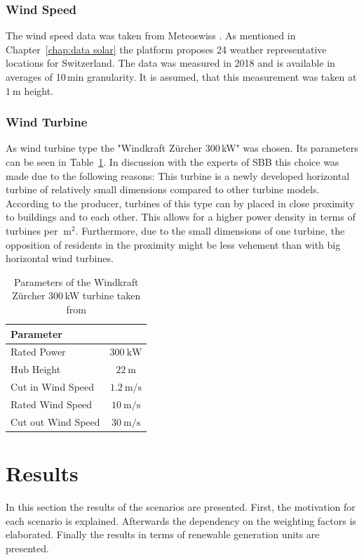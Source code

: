 \subsubsection{Wind Speed}
The wind speed data was taken from Meteoswiss \cite{idaweb}. As mentioned in Chapter~\ref{chap:data solar} the platform proposes 24 weather representative locations for Switzerland. The data was measured in 2018 and is available in averages of 10\,min granularity. It is assumed, that this measurement was taken at $\SI{1}{\metre}$ height. 

\subsubsection{Wind Turbine}
As wind turbine type the "Windkraft Zürcher 300\,kW" was chosen. Its parameters can be seen in Table~\ref{tab:wind_turbine_zurcher}. In discussion with the experts of SBB this choice was made due to the following reasons: This turbine is a newly developed horizontal turbine of relatively small dimensions compared to other turbine models. According to the producer, turbines of this type can by placed in close proximity to buildings and to each other. This allows for a higher power density in terms of turbines per $\SI{}{\square\metre}$. Furthermore, due to the small dimensions of one turbine, the opposition of residents in the proximity might be less vehement than with big horizontal wind turbines. 


\begin{table}[h!]
\centering
\begin{tabular}{|l|c|} \hline
    \textbf{Parameter} & \\ \hline
     Rated Power & $\SI{300}{\kW}$ \\ \hline
     Hub Height & $\SI{22}{\m}$  \\ \hline
     Cut in Wind Speed & $\SI{1.2}{\meter\per\second}$ \\ \hline
     Rated Wind Speed & $\SI{10}{\meter\per\second}$ \\ \hline
     Cut out Wind Speed & $\SI{30}{\meter\per\second}$ \\ \hline
\end{tabular}
\caption{Parameters of the Windkraft Zürcher 300\,kW turbine taken from \cite{zurcher}}
\label{tab:wind_turbine_zurcher}
\end{table}


\section{Results}
In this section the results of the scenarios are presented. First, the motivation for each scenario is explained. Afterwards the dependency on the weighting factors is elaborated. Finally the results in terms of renewable generation units are presented. 

